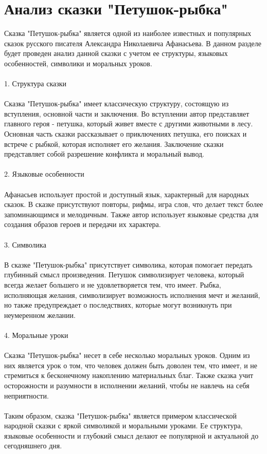 \documentclass{article}
\begin{document}
\section{Анализ сказки "{}Петушок-рыбка"{}}
Сказка "{}Петушок-рыбка"{} является одной из наиболее известных и популярных сказок русского писателя Александра Николаевича Афанасьева. В данном разделе будет проведен анализ данной сказки с учетом ее структуры, языковых особенностей, символики и моральных уроков.\\
~\\
1. Структура сказки\\
~\\
Сказка "{}Петушок-рыбка"{} имеет классическую структуру, состоящую из вступления, основной части и заключения. Во вступлении автор представляет главного героя - петушка, который живет вместе с другими животными в лесу. Основная часть сказки рассказывает о приключениях петушка, его поисках и встрече с рыбкой, которая исполняет его желания. Заключение сказки представляет собой разрешение конфликта и моральный вывод.\\
~\\
2. Языковые особенности\\
~\\
Афанасьев использует простой и доступный язык, характерный для народных сказок. В сказке присутствуют повторы, рифмы, игра слов, что делает текст более запоминающимся и мелодичным. Также автор использует языковые средства для создания образов героев и передачи их характера.\\
~\\
3. Символика\\
~\\
В сказке "{}Петушок-рыбка"{} присутствует символика, которая помогает передать глубинный смысл произведения. Петушок символизирует человека, который всегда желает большего и не удовлетворяется тем, что имеет. Рыбка, исполняющая желания, символизирует возможность исполнения мечт и желаний, но также предупреждает о последствиях, которые могут возникнуть при неумеренном желании.\\
~\\
4. Моральные уроки\\
~\\
Сказка "{}Петушок-рыбка"{} несет в себе несколько моральных уроков. Одним из них является урок о том, что человек должен быть доволен тем, что имеет, и не стремиться к бесконечному накоплению материальных благ. Также сказка учит осторожности и разумности в исполнении желаний, чтобы не навлечь на себя неприятности.\\
~\\
Таким образом, сказка "{}Петушок-рыбка"{} является примером классической народной сказки с яркой символикой и моральными уроками. Ее структура, языковые особенности и глубокий смысл делают ее популярной и актуальной до сегодняшнего дня.
\end{document}
